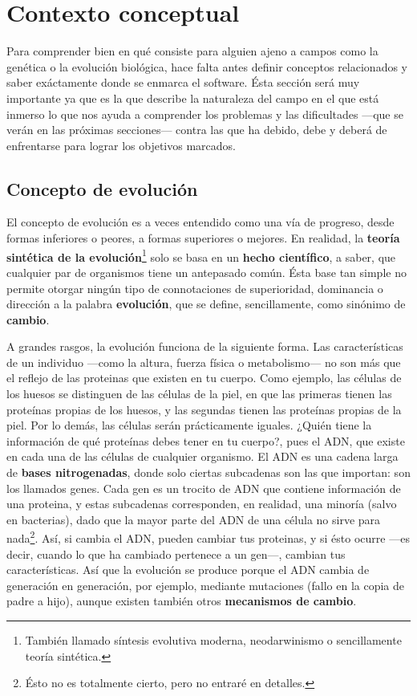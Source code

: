 \section{Contexto conceptual}
\label{sec:conceptos}

Para comprender bien en qué consiste \fpt para alguien ajeno
a campos como la genética o la evolución biológica, hace falta antes
definir conceptos relacionados y saber exáctamente donde se enmarca el
software. Ésta sección será muy importante ya que es la que describe
la naturaleza del campo en el que está inmerso \fpt lo que nos ayuda a
comprender los problemas y las dificultades \----que se verán en las
próximas secciones\---- contra las que \fpt ha debido, debe y deberá
de enfrentarse para lograr los objetivos marcados.

\subsection{Concepto de evolución}
El concepto de evolución es a veces entendido como una vía de
progreso, desde formas inferiores o peores, a formas superiores o
mejores. En realidad, la \textbf{teoría sintética de la
  evolución}\footnote{También llamado síntesis evolutiva moderna,
  neodarwinismo o sencillamente teoría sintética.} solo se
basa en un \textbf{hecho científico}, a saber, que cualquier par
de organismos tiene un antepasado común. Ésta base tan simple no
permite otorgar ningún tipo de connotaciones de superioridad,
dominancia o dirección a la palabra \textbf{evolución}, que se define,
sencillamente, como sinónimo de \textbf{cambio}.

A grandes rasgos, la evolución funciona de la siguiente forma. Las
características de un individuo \----como la altura, fuerza física o
metabolismo\---- no son más que el reflejo de las
proteinas que existen en tu cuerpo. Como ejemplo, las células de los huesos se
distinguen de las células de la piel, en que las primeras tienen las
proteínas propias de los huesos, y las segundas tienen las proteínas
propias de la piel. Por lo demás, las células serán prácticamente
iguales. ¿Quién tiene la información de qué proteínas debes tener en
tu cuerpo?, pues el ADN, que existe en
cada una de las células de cualquier organismo. El ADN es una cadena larga de
\textbf{bases nitrogenadas}, donde solo ciertas subcadenas son las que
importan: son los llamados genes. Cada gen es un trocito de ADN que
contiene información de una proteina, y estas subcadenas corresponden,
en realidad, una minoría (salvo en bacterias), dado que la mayor parte
del ADN de una célula no sirve para nada\footnote{Ésto no es
  totalmente cierto, pero no entraré en detalles.}. Así, si cambia el ADN,
pueden cambiar tus proteinas, y si ésto ocurre \----es decir, cuando lo
que ha cambiado pertenece a un gen\----, cambian tus
características. Así que la evolución se produce porque el ADN cambia
de generación en generación, por ejemplo, mediante mutaciones (fallo
en la copia de padre a hijo), aunque existen también otros
\textbf{mecanismos de cambio}.

